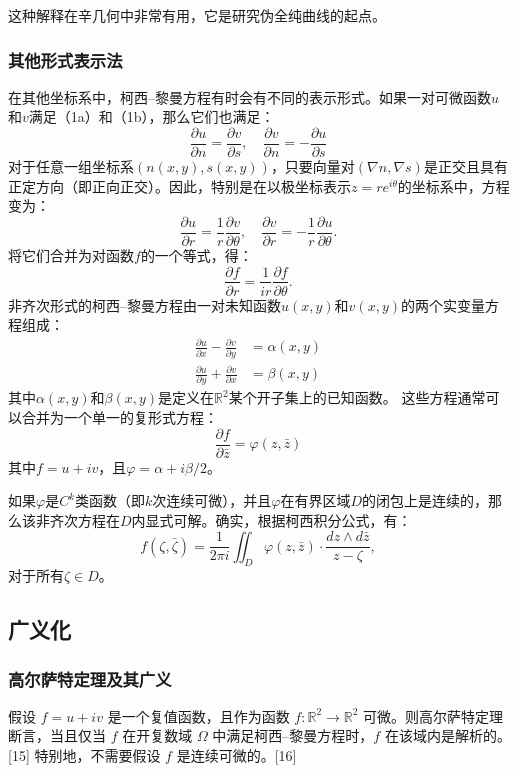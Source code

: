 这种解释在辛几何中非常有用，它是研究伪全纯曲线的起点。
\subsubsection{其他形式表示法}  
在其他坐标系中，柯西–黎曼方程有时会有不同的表示形式。如果一对可微函数\( u \)和\( v \)满足（1a）和（1b），那么它们也满足：
\[
\frac{\partial u}{\partial n} = \frac{\partial v}{\partial s}, \quad \frac{\partial v}{\partial n} = -\frac{\partial u}{\partial s}~
\]
对于任意一组坐标系\( (n(x, y), s(x, y)) \)，只要向量对\( (\nabla n, \nabla s) \)是正交且具有正定方向（即正向正交）。因此，特别是在以极坐标表示\( z = re^{i\theta} \)的坐标系中，方程变为：
\[
\frac{\partial u}{\partial r} = \frac{1}{r} \frac{\partial v}{\partial \theta}, \quad \frac{\partial v}{\partial r} = -\frac{1}{r} \frac{\partial u}{\partial \theta}.~
\]
将它们合并为对函数\( f \)的一个等式，得：
\[
\frac{\partial f}{\partial r} = \frac{1}{ir} \frac{\partial f}{\partial \theta}.~
\]
非齐次形式的柯西–黎曼方程由一对未知函数\( u(x, y) \)和\( v(x, y) \)的两个实变量方程组成：
\[
\begin{aligned}
\frac{\partial u}{\partial x} - \frac{\partial v}{\partial y} &= \alpha(x, y) \\
\frac{\partial u}{\partial y} + \frac{\partial v}{\partial x} &= \beta(x, y)
\end{aligned}~
\]
其中\( \alpha(x, y) \)和\( \beta(x, y) \)是定义在\( \mathbb{R}^2 \)某个开子集上的已知函数。  
这些方程通常可以合并为一个单一的复形式方程：
\[
\frac{\partial f}{\partial \bar{z}} = \varphi(z, \bar{z})~
\]
其中\( f = u + iv \)，且\( \varphi = \alpha + i\beta/2\)。

如果\( \varphi \)是\( C^k \)类函数（即\( k \)次连续可微），并且\( \varphi \)在有界区域\( D \)的闭包上是连续的，那么该非齐次方程在\( D \)内显式可解。确实，根据柯西积分公式，有：
\[
f(\zeta, \bar{\zeta}) = \frac{1}{2\pi i} \iint_D \varphi(z, \bar{z}) \cdot \frac{dz \wedge d\bar{z}}{z - \zeta},~
\]
对于所有\(\zeta \in D\)。
\subsection{广义化}  
\subsubsection{高尔萨特定理及其广义}  

假设 \( f = u + iv \) 是一个复值函数，且作为函数 \( f: \mathbb{R}^2 \to \mathbb{R}^2 \) 可微。则高尔萨特定理断言，当且仅当 \( f \) 在开复数域 \( \Omega \) 中满足柯西–黎曼方程时，\( f \) 在该域内是解析的。[15] 特别地，不需要假设 \( f \) 是连续可微的。[16]

